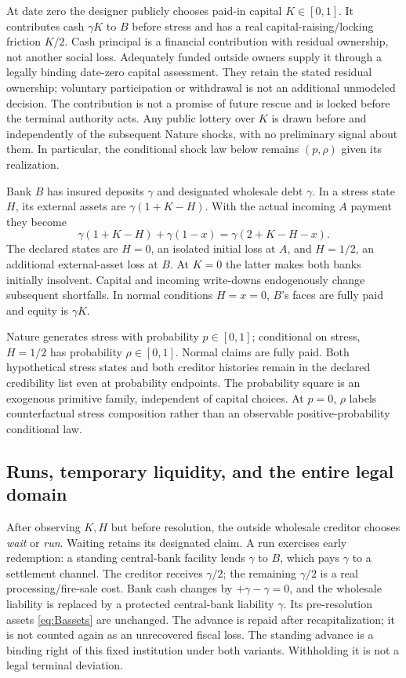 \documentclass[11pt,a4paper]{article}
\numberwithin{equation}{section}
\theoremstyle{definition}
\begin{document}
At date zero the designer publicly chooses paid-in capital \(K\in[0,1]\).
It contributes cash \(\gamma K\) to \(B\) before stress and has a real
capital-raising/locking friction \(K/2\). Cash principal is a financial
contribution with residual ownership, not another social loss. Adequately
funded outside owners supply it through a legally binding date-zero
capital assessment. They retain the stated residual ownership; voluntary
participation or withdrawal is not an additional unmodeled decision.
The contribution is not a promise of future rescue and is locked before
the terminal authority acts. Any public lottery over
\(K\) is drawn before and independently of the subsequent Nature shocks,
with no preliminary signal about them. In particular, the conditional
shock law below remains \((p,\rho)\) given its realization.

Bank \(B\) has insured deposits \(\gamma\) and designated wholesale debt
\(\gamma\). In a stress state \(H\), its external assets are
\(\gamma(1+K-H)\). With the actual incoming \(A\) payment they become
\begin{equation}\label{eq:Bassets}
 \gamma(1+K-H)+\gamma(1-x)=\gamma(2+K-H-x).
\end{equation}
The declared states are \(H=0\), an isolated initial loss at \(A\), and
\(H=1/2\), an additional external-asset loss at \(B\). At \(K=0\) the
latter makes both banks initially insolvent. Capital and incoming
write-downs endogenously change subsequent shortfalls. In normal
conditions \(H=x=0\), \(B\)'s faces are fully paid and equity is
\(\gamma K\).

Nature generates stress with probability \(p\in[0,1]\); conditional on
stress, \(H=1/2\) has probability \(\rho\in[0,1]\). Normal claims are
fully paid. Both hypothetical stress states and both creditor histories
remain in the declared credibility list even at probability endpoints.
The probability square is an exogenous primitive family, independent
of capital choices. At \(p=0\), \(\rho\) labels counterfactual stress
composition rather than an observable positive-probability conditional law.

\subsection{Runs, temporary liquidity, and the entire legal domain}
After observing \(K,H\) but before resolution, the outside wholesale
creditor chooses \emph{wait} or \emph{run}. Waiting retains its designated
claim. A run exercises early redemption: a standing central-bank facility
lends \(\gamma\) to \(B\), which pays \(\gamma\) to a settlement channel.
The creditor receives \(\gamma/2\); the remaining \(\gamma/2\) is a real
processing/fire-sale cost. Bank cash changes by
\(+\gamma-\gamma=0\), and the wholesale liability is replaced by a
protected central-bank liability \(\gamma\). Its pre-resolution assets
\eqref{eq:Bassets} are unchanged. The advance is repaid after
recapitalization; it is not counted again as an unrecovered fiscal loss.
The standing advance is a binding right of this fixed institution under
both variants. Withholding it is not a legal terminal deviation.
\end{document}
